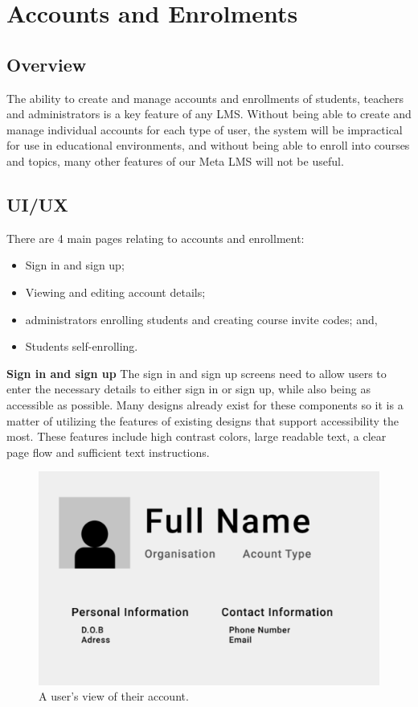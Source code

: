 \section{Accounts and Enrolments}
\subsection{Overview}
The ability to create and manage accounts and enrollments of students, teachers and administrators is a key feature of any LMS. Without being able to create and manage individual accounts for each type of user, the system will be impractical for use in educational environments, and without being able to enroll into courses and topics, many other features of our Meta LMS will not be useful.

\subsection{UI/UX}
There are 4 main pages relating to accounts and enrollment:
\begin{itemize}
  \item Sign in and sign up;
  \item Viewing and editing account details;
  \item administrators enrolling students and creating course invite codes; and,
  \item Students self-enrolling.
\end{itemize}

\textbf{Sign in and sign up}
The sign in and sign up screens need to allow users to enter the necessary details to either sign in or sign up, while also being as accessible as possible. Many designs already exist for these components so it is a matter of utilizing the features of existing designs that support accessibility the most. These features include high contrast colors, large readable text, a clear page flow and sufficient text instructions.

\begin{figure}[h!]
  \centering
  \includegraphics[scale=0.2]{images/accounts-profile}
  \caption{A user's view of their account.}
\end{figure}

